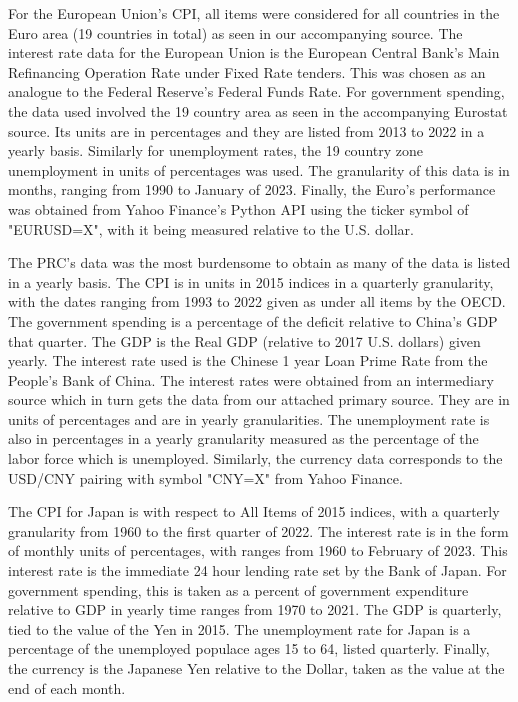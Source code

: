 \documentclass[11pt,regno]{amsart}
\theoremstyle{plain}
\numberwithin{equation}{section}
\begin{document}
For the European Union's CPI, all items were considered for all countries in the Euro area (19 countries in total) as seen in our accompanying source. The interest rate data for the European Union is the European Central Bank's Main Refinancing Operation Rate under Fixed Rate tenders. This was chosen as an analogue to the Federal Reserve's Federal Funds Rate. For government spending, the data used involved the 19 country area as seen in the accompanying Eurostat source. Its units are in percentages and they are listed from 2013 to 2022 in a yearly basis. Similarly for unemployment rates, the 19 country zone unemployment in units of percentages was used. The granularity of this data is in months, ranging from 1990 to January of 2023. Finally, the Euro's performance was obtained from Yahoo Finance's Python API using the ticker symbol of "EURUSD=X", with it being measured relative to the U.S. dollar.


The PRC's data was the most burdensome to obtain as many of the data is listed in a yearly basis. The CPI is in units in 2015 indices in a quarterly granularity, with the dates ranging from 1993 to 2022 given as under all items by the OECD. The government spending is a percentage of the deficit relative to China's GDP that quarter. The GDP is the Real GDP (relative to 2017 U.S. dollars) given yearly. The interest rate used is the Chinese 1 year Loan Prime Rate from the People's Bank of China.  The interest rates were obtained from an intermediary source which in turn gets the data from our attached primary source. They are in units of percentages and are in yearly granularities.  The unemployment rate is also in percentages in a yearly granularity measured as the percentage of the labor force which is unemployed. Similarly, the currency data corresponds to the USD/CNY pairing with symbol "CNY=X" from Yahoo Finance. 



The CPI for Japan is with respect to All Items of 2015 indices, with a quarterly granularity from 1960 to the first quarter of 2022.  The interest rate is in the form of monthly units of percentages, with ranges from 1960 to February of 2023. This interest rate is the immediate 24 hour lending rate set by the Bank of Japan. For government spending, this is taken as a percent of government expenditure relative to GDP in yearly time ranges from 1970 to 2021. The GDP is quarterly, tied to the value of the Yen in 2015. The unemployment rate for Japan is a percentage of the unemployed populace ages 15 to 64, listed quarterly. Finally, the currency is the Japanese Yen relative to the Dollar, taken as the value at the end of each month.
\end{document}
